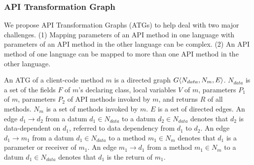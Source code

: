 \subsubsection{API Transformation Graph}

We propose API Transformation Graphs (ATGs) to help deal with two
major challenges. (1) Mapping parameters of an API method in one language with
parameters of an API method in the other language can be complex. (2) An API
method of one language can be mapped to more than one API method in the
other language.

An ATG of a client-code method $m$ is a directed graph $G\langle N_{data}, N_{m}, E \rangle$. 
$N_{data}$ is a set of the fields $F$ of $m$'s declaring class, local variables $V$ of
$m$, parameters $P_1$ of $m$, parameters $P_2$ of API methods invoked
by $m$, and returns $R$ of all methods. $N_{m}$ is a set of
methods invoked by $m$. $E$ is a set of directed edges. An edge
$d_1\rightarrow d_2$ from a datum $d_1 \in N_{data}$ to a datum $d_2
\in N_{data}$ denotes that $d_2$ is data-dependent on $d_1$, referred to 
data dependency from $d_1$ to $d_2$. An edge $d_1 \rightarrow m_1$ from a datum $d_1 \in N_{data}$ to a
method $ m_1 \in N_{m}$ denotes that $d_1$ is a parameter or receiver
of $m_1$. An edge $m_1 \rightarrow d_1$ from a method $m_1
\in N_{m}$ to a datum $d_1 \in N_{data}$ denotes that $d_1$ is the return
of $m_1$.

%
%
%

